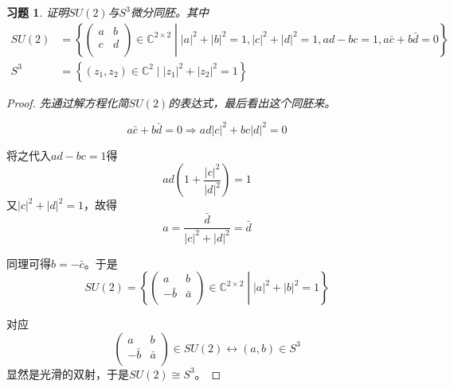 \documentclass[winfonts,UTF8,c5size,a4paper,fancyhdr,hyperref,titlepage,nocap]{ctexart}
\newtheorem{xiti}{习题}
\theoremstyle{definition}
\theoremstyle{remark}
\numberwithin{equation}{subsection}
\newcommand{\Complex}{\mathbb{C}}
\begin{document}
\begin{xiti}
  证明$SU(2)$与$S^3$微分同胚。其中
  \begin{align*}
  SU(2)&=\left\{
  \begin{pmatrix}
  a & b \\
  c & d \\
  \end{pmatrix}
  \in\Complex^{2\times2}
  \middle|
  |a|^2+|b|^2=1, |c|^2+|d|^2=1, ad-bc=1, a\bar{c}+b\bar{d}=0
  \right\}\\
  S^3&=\left\{(z_1,z_2)\in\Complex^2\mid |z_1|^2+|z_2|^2=1\right\}
  \end{align*}
\end{xiti}
\begin{proof}
  \emph{先通过解方程化简$SU(2)$的表达式，最后看出这个同胚来。}

  \begin{equation*}
  a\bar{c}+b\bar{d}=0\Longrightarrow ad|c|^2+bc|d|^2=0
  \end{equation*}

  将之代入$ad-bc=1$得
  \begin{equation*}
  ad(1+\frac{|c|^2}{|d|^2})=1
  \end{equation*}
  又$|c|^2+|d|^2=1$，故得
  \begin{equation*}
  a=\frac{\bar{d}}{|c|^2+|d|^2}=\bar{d}
  \end{equation*}

  同理可得$b=-\bar{c}$。于是
  \begin{equation*}
  SU(2)=\left\{
  \begin{pmatrix}
  a & b \\
  -\bar{b} & \bar{a} \\
  \end{pmatrix}
  \in\Complex^{2\times2}
  \middle|
  |a|^2+|b|^2=1
  \right\}
  \end{equation*}

  对应
  \begin{equation*}
  \begin{pmatrix}
  a & b \\
  -\bar{b} & \bar{a} \\
  \end{pmatrix}
  \in SU(2)
  \longleftrightarrow
  (a,b)\in S^3
  \end{equation*}
  显然是光滑的双射，于是$SU(2)\cong S^3$。
\end{proof}
\end{document}
